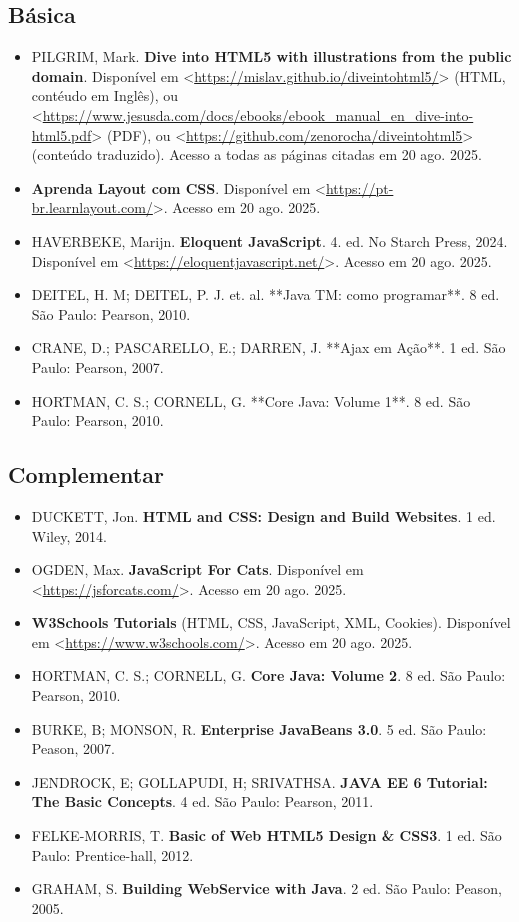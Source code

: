 \documentclass[a4paper, 12pt]{article}
\begin{document}
\subsection{Básica}

\begin{itemize}
    \item PILGRIM, Mark. \textbf{Dive into HTML5 with illustrations from the public domain}. Disponível em <\url{https://mislav.github.io/diveintohtml5/}> (HTML, contéudo em Inglês), ou <\url{https://www.jesusda.com/docs/ebooks/ebook_manual_en_dive-into-html5.pdf}> (PDF), ou <\url{https://github.com/zenorocha/diveintohtml5}> (conteúdo traduzido). Acesso a todas as páginas citadas em 20 ago. 2025.
    \item \textbf{Aprenda Layout com CSS}. Disponível em <\url{https://pt-br.learnlayout.com/}>. Acesso em 20 ago. 2025.
    \item HAVERBEKE, Marijn. \textbf{Eloquent JavaScript}. 4. ed. No Starch Press, 2024. Disponível em <\url{https://eloquentjavascript.net/}>. Acesso em 20 ago. 2025.
    \item DEITEL, H. M; DEITEL, P. J. et. al. **Java TM: como programar**. 8 ed. São Paulo: Pearson, 2010.
    \item CRANE, D.; PASCARELLO, E.; DARREN, J. **Ajax em Ação**. 1 ed. São Paulo: Pearson, 2007.
    \item HORTMAN, C. S.; CORNELL, G. **Core Java: Volume 1**. 8 ed. São Paulo: Pearson, 2010.
\end{itemize}

\subsection{Complementar}

\begin{itemize}
    \item DUCKETT, Jon. \textbf{HTML and CSS: Design and Build Websites}. 1 ed. Wiley, 2014.
    \item OGDEN, Max. \textbf{JavaScript For Cats}. Disponível em <\url{https://jsforcats.com/}>. Acesso em 20 ago. 2025.
    \item \textbf{W3Schools Tutorials} (HTML, CSS, JavaScript, XML, Cookies). Disponível em <\url{https://www.w3schools.com/}>. Acesso em 20 ago. 2025.
    \item HORTMAN, C. S.; CORNELL, G. \textbf{Core Java: Volume 2}. 8 ed. São Paulo: Pearson, 2010.
    \item BURKE, B; MONSON, R. \textbf{Enterprise JavaBeans 3.0}. 5 ed. São Paulo: Peason, 2007.
    \item JENDROCK, E; GOLLAPUDI, H; SRIVATHSA. \textbf{JAVA EE 6 Tutorial: The Basic Concepts}. 4 ed. São Paulo: Pearson, 2011.
    \item FELKE-MORRIS, T. \textbf{Basic of Web HTML5 Design \& CSS3}. 1 ed. São Paulo: Prentice-hall, 2012.
    \item GRAHAM, S. \textbf{Building WebService with Java}. 2 ed. São Paulo: Peason, 2005.
\end{itemize}
\end{document}
